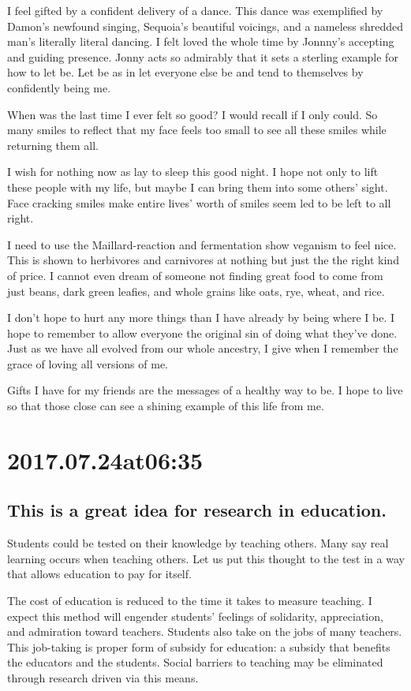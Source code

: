 I feel gifted by a confident delivery of a dance. This dance was exemplified by Damon's newfound singing, Sequoia's beautiful voicings, and a nameless shredded man's literally literal dancing. I felt loved the whole time by Jonnny's accepting and guiding presence. Jonny acts so admirably that it sets a sterling example for how to let be. Let be as in let everyone else be and tend to themselves by confidently being me.

When was the last time I ever felt so good? I would recall if I only could. So many smiles to reflect that my face feels too small to see all these smiles while returning them all.

I wish for nothing now as lay to sleep this good night. I hope not only to lift these people with my life, but maybe I can bring them into some others' sight. Face cracking smiles make entire lives' worth of smiles seem led to be left to all right.

I need to use the Maillard-reaction and fermentation show veganism to feel nice. This is shown to herbivores and carnivores at nothing but just the the right kind of price. I cannot even dream of someone not finding great food to come from just beans, dark green leafies, and whole grains like oats, rye, wheat, and rice.

I don't hope to hurt any more things than I have already by being where I be. I hope to remember to allow everyone the original sin of doing what they've done. Just as we have all evolved from our whole ancestry, I give when I remember the grace of loving all versions of me.

Gifts I have for my friends are the messages of a healthy way to be. I hope to live so that those close can see a shining example of this life from me.

\section*{ 2017.07.24at06:35 }
\subsection*{ This is a great idea for research in education. }
Students could be tested on their knowledge by teaching others. Many say real learning occurs when teaching others. Let us put this thought to the test in a way that allows education to pay for itself.

The cost of education is reduced to the time it takes to measure teaching. I expect this method will engender students' feelings of solidarity, appreciation, and admiration toward teachers. Students also take on the jobs of many teachers. This job-taking is proper form of subsidy for education: a subsidy that benefits the educators and the students. Social barriers to teaching may be eliminated through research driven via this means.

